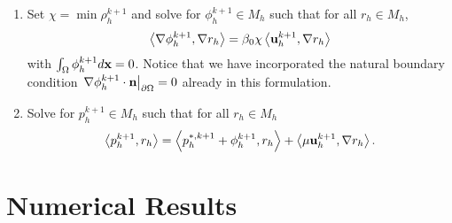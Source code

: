 \documentclass[letterpaper]{erdc}
\begin{document}
\begin{enumerate}
\item Set $\chi = \min \rho_h^{k+1}$ and solve for $\phi_h^{k+1}\in M_h$ such that for all $r_h\in M_h$,
\begin{equation}
 \left\langle \nabla \phi_h^{k+1}, \nabla r_h \right\rangle = \beta_0 \chi \left\langle \textbf{u}_h^{k+1}, \nabla r_h \right\rangle
\end{equation}
with $\int_{\Omega}\phi_h^{k+1}d\textbf{x} = 0$.  Notice that we have incorporated the natural boundary condition $\left.\nabla\phi_h^{k+1}\cdot\textbf{n}\right|_{\partial\Omega} = 0 $ already in this formulation.  

\item Solve for $p_h^{k+1}\in M_h$ such that for all $r_h\in M_h$
\begin{equation}
  \left\langle p_h^{k+1}, r_h \right\rangle = \left\langle p_h^{*,k+1} + \phi_h^{k+1}, r_h \right\rangle + \left\langle \mu \textbf{u}_h^{k+1}, \nabla r_h \right\rangle.
\end{equation}
\end{enumerate}



%
%
%
\section{Numerical Results}\label{sec:NumericalResults}
\end{document}
